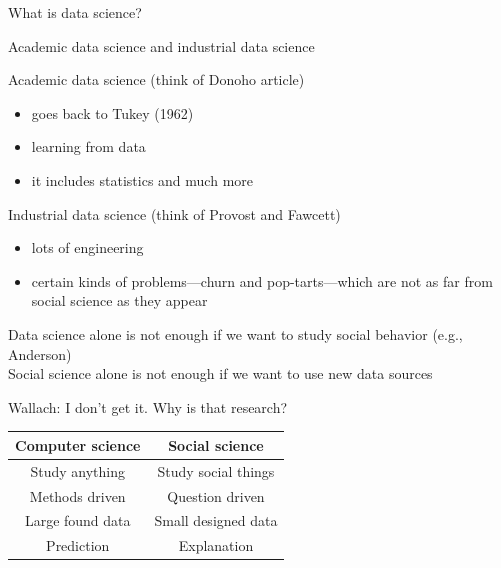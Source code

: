 \documentclass{beamer}
\def\vf{\vfill}
\begin{document}
\begin{frame}

\begin{center}
\LARGE{What is data science?}
\end{center}
Academic data science and industrial data science

\end{frame}
\begin{frame}

Academic data science (think of Donoho article)\\
\begin{itemize}
\item goes back to Tukey (1962)
\pause
\item learning from data
\pause
\item it includes statistics and much more
\end{itemize}

\end{frame}
\begin{frame}

Industrial data science (think of Provost and Fawcett)
\begin{itemize}
\item lots of engineering
\pause
\item certain kinds of problems---churn and pop-tarts---which are not as far from social science as they appear
\end{itemize}

\end{frame}
\begin{frame}

Data science alone is not enough if we want to study social behavior (e.g., Anderson)\\
\pause
Social science alone is not enough if we want to use new data sources

\end{frame}
\begin{frame}

Wallach: I don't get it.  Why is that research? \\
\pause
\vf
\begin{center}
\begin{tabular}{cc}
Computer science & Social science\\
\midrule
Study anything & Study social things\\
Methods driven & Question driven\\
Large found data & Small designed data\\
Prediction & Explanation\\
\end{tabular}
\end{center}

\end{frame}
\end{document}
